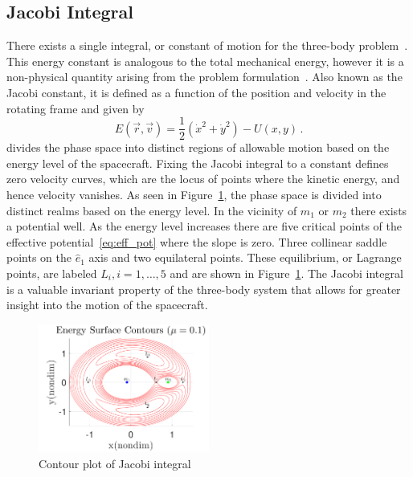 \documentclass[preprint]{elsarticle}
\begin{document}
\subsection{Jacobi Integral}\label{sec:jacobi}
There exists a single integral, or constant of motion for the three-body problem~\cite{szebehely1967,lanczos1970}.
This energy constant is analogous to the total mechanical energy, however it is a non-physical quantity arising from the problem formulation~\cite{szebehely1967}.
Also known as the Jacobi constant, it is defined as a function of the position and velocity in the rotating frame and given by
\begin{equation}
	E\left( \vec{r} , \vec{v} \right) = \frac{1}{2}\left( \dot{x}^2 + \dot{y}^2\right) - U\left(x,y \right) \, .
	\label{eq:jacobi}
\end{equation}
 divides the phase space into distinct regions of allowable motion based on the energy level of the spacecraft.
Fixing the Jacobi integral to a constant defines zero velocity curves, which are the locus of points where the kinetic energy, and hence velocity vanishes.
As seen in Figure~\ref{fig:energy_contour}, the phase space is divided into distinct realms based on the energy level.
In the vicinity of \( m_1\) or \(m_2\) there exists a potential well. 
As the energy level increases there are five critical points of the effective potential~\cref{eq:eff_pot} where the slope is zero.
Three collinear saddle points on the \(\hat{e}_1\) axis and two equilateral points.
These equilibrium, or Lagrange points, are labeled \( L_i, i = 1, \hdots, 5 \) and are shown in Figure~\ref{fig:energy_contour}.
The Jacobi integral is a valuable invariant property of the three-body system that allows for greater insight into the motion of the spacecraft.
\begin{figure}[htbp]
	\centering
	\includegraphics[width=0.5\textwidth]{energy_contours}
	\caption{Contour plot of Jacobi integral}
	\label{fig:energy_contour}
\end{figure} 
\end{document}
